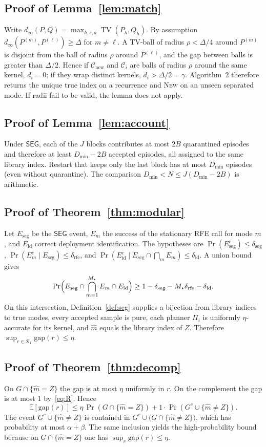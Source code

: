 \documentclass[11pt]{article}
\newcommand{\Rone}{\mathcal{R}_1}
\newcommand{\TV}{\operatorname{TV}}
\newcommand{\SEG}{\mathsf{SEG}}
\newcommand{\E}{\mathbb{E}}
\newcommand{\Prb}{\Pr}
\newcommand{\cC}{\mathcal{C}}
\newcommand{\deltaid}{\delta_{\mathrm{id}}}
\newcommand{\deltaseg}{\delta_{\mathrm{seg}}}
\newcommand{\deltarfe}{\delta_{\mathrm{rfe}}}
\begin{document}
\subsection{Proof of Lemma~\ref{lem:match}}
Write $d_\infty(P,Q)=\max_{h,s,a}\TV(P_h,Q_h)$. By assumption
$d_\infty(P^{(m)},P^{(\ell)})\ge\Delta$ for $m\neq\ell$. A TV-ball of
radius $\rho<\Delta/4$ around $P^{(m)}$ is disjoint from the ball of radius
$\rho$ around $P^{(\ell)}$, and the gap between balls is greater than
$\Delta/2$. Hence if $\cC_{\mathrm{new}}$ and $\cC_i$ are balls of radius
$\rho$ around the same kernel, $d_i=0$; if they wrap distinct kernels,
$d_i>\Delta/2=\gamma$. Algorithm~2 therefore returns the unique true index
on a recurrence and \textsc{New} on an unseen separated mode. If radii
fail to be valid, the lemma does not apply.

\subsection{Proof of Lemma~\ref{lem:account}}
Under $\SEG$, each of the $J$ blocks contributes at most $2B$ quarantined
episodes and therefore at least $D_{\min}-2B$ accepted episodes, all
assigned to the same library index. Restart that keeps only the last block
has at most $D_{\min}$ episodes (even without quarantine). The comparison
$D_{\min}<N\le J(D_{\min}-2B)$ is arithmetic.

\subsection{Proof of Theorem~\ref{thm:modular}}
Let $E_{\mathrm{seg}}$ be the $\SEG$ event, $E_m$ the success of the
stationary RFE call for mode $m$, and $E_{\mathrm{id}}$ correct deployment
identification. The hypotheses are
$\Prb(E_{\mathrm{seg}}^c)\le\deltaseg$,
$\Prb(E_m^c\mid E_{\mathrm{seg}})\le\deltarfe$, and
$\Prb(E_{\mathrm{id}}^c\mid E_{\mathrm{seg}}\cap\bigcap_m E_m)\le\deltaid$.
A union bound gives
\[
\Prb\Bigl(E_{\mathrm{seg}}\cap\bigcap_{m=1}^{M_\star}E_m\cap E_{\mathrm{id}}\Bigr)
\ge 1-\deltaseg-M_\star\deltarfe-\deltaid.
\]
On this intersection, Definition~\ref{def:seg} supplies a bijection from
library indices to true modes, every accepted sample is pure, each planner
$\Pi_i$ is uniformly $\eta$-accurate for its kernel, and $\widehat m$ equals
the library index of $Z$. Therefore
$\sup_{r\in\Rone}\mathrm{gap}(r)\le\eta$.

\subsection{Proof of Theorem~\ref{thm:decomp}}
On $G\cap\{\widehat m=Z\}$ the gap is at most $\eta$ uniformly in $r$. On the
complement the gap is at most $1$ by~\eqref{eq:R}. Hence
\[
\E[\mathrm{gap}(r)]
\le \eta\,\Prb(G\cap\{\widehat m=Z\})
+ 1\cdot\Prb(G^c\cup\{\widehat m\neq Z\}).
\]
The event $G^c\cup\{\widehat m\neq Z\}$ is contained in
$G^c\cup\bigl(G\cap\{\widehat m\neq Z\}\bigr)$, which has probability at most
$\alpha+\beta$. The same inclusion yields the high-probability bound because
on $G\cap\{\widehat m=Z\}$ one has $\sup_r\mathrm{gap}(r)\le\eta$.
\end{document}
